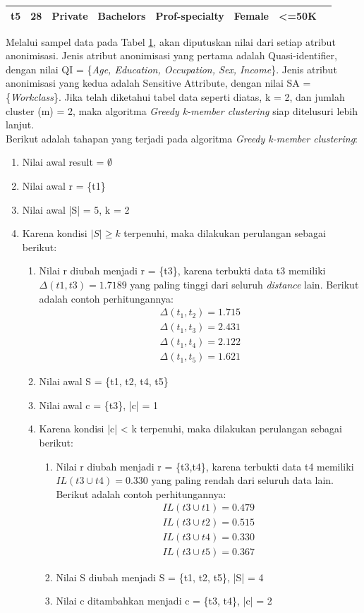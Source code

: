 \documentclass[a4paper,twoside]{article}
\begin{document}
\begin{enumerate}
\begin{table}[H]
\begin{tabular}{c c c c c c c c}
t5 & 28 & Private & Bachelors & Prof-specialty & Female & <=50K	 \\ 
\hline 
\end{tabular} 
\label{table:adults}
\end{table}

\par Melalui sampel data pada Tabel \ref{table:adults}, akan diputuskan nilai dari setiap atribut anonimisasi. Jenis atribut anonimisasi yang pertama adalah Quasi-identifier, dengan nilai QI = \{\textit{Age, Education, Occupation, Sex, Income}\}. Jenis atribut anonimisasi yang kedua adalah Sensitive Attribute, dengan nilai SA = \{\textit{Workclass}\}. Jika telah diketahui tabel data seperti diatas, k = 2, dan jumlah cluster (m) = 2, maka algoritma \textit{Greedy k-member clustering} siap ditelusuri lebih lanjut.\\

\noindent Berikut adalah tahapan yang terjadi pada algoritma \textit{Greedy k-member clustering}:

\begin{enumerate}
\item Nilai awal result = $\emptyset$
\item Nilai awal r = \{t1\}
\item Nilai awal |S| = 5, k = 2
\item Karena kondisi $|S| \geq k$ terpenuhi, maka dilakukan perulangan sebagai berikut:
\begin{enumerate}
\item Nilai r diubah menjadi r = \{t3\}, karena terbukti data t3 memiliki $\Delta(t1,t3)=1.7189$ yang paling tinggi dari seluruh \textit{distance} lain. Berikut adalah contoh perhitungannya:
\begin{align*}
\Delta (t_1,t_2) = 1.715\\
\Delta (t_1,t_3) = 2.431\\
\Delta (t_1,t_4) = 2.122\\
\Delta (t_1,t_5) = 1.621 
\end{align*}
\item Nilai awal S = \{t1, t2, t4, t5\}
\item Nilai awal c = \{t3\}, |c| = 1
\item Karena kondisi |c| < k terpenuhi, maka dilakukan perulangan sebagai berikut:

\begin{enumerate}
\item Nilai r diubah menjadi r = \{t3,t4\}, karena terbukti data t4 memiliki $IL(t3 \cup t4)=0.330$ yang paling rendah dari seluruh data lain. Berikut adalah contoh perhitungannya:
\begin{align*}
IL(t3 \cup t1) = 0.479 \\
IL(t3 \cup t2) = 0.515 \\
IL(t3 \cup t4) = 0.330 \\
IL(t3 \cup t5) = 0.367 
\end{align*}
\item Nilai S diubah menjadi S = \{t1, t2, t5\}, |S| = 4
\item Nilai c ditambahkan menjadi c = \{t3, t4\}, |c| = 2


\end{enumerate}
\end{enumerate}
\end{enumerate}
\end{enumerate}
\end{document}
